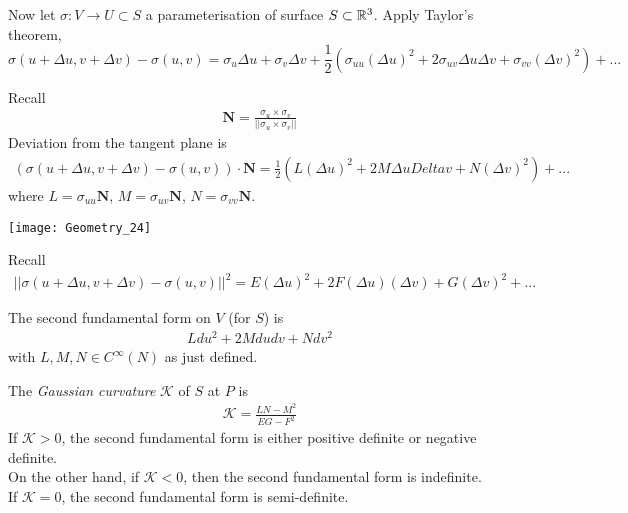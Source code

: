 \documentclass[a4paper]{article}
\begin{document}
Now let $\sigma: V \to U \subset S$ a parameterisation of surface $S \subset \mathbb{R}^3$. Apply Taylor's theorem, $$\sigma(u+\Delta u,v+\Delta v) - \sigma(u,v) = \sigma_u \Delta u + \sigma_v \Delta v + \frac{1}{2} (\sigma_{uu} (\Delta u)^2 + 2\sigma_{uv} \Delta u \Delta v + \sigma_{vv} (\Delta v)^2) + ...$$

Recall
\begin{equation*}
\begin{aligned}
\mathbf{N} = \frac{\sigma_u \times \sigma_v}{||\sigma_u \times \sigma_v||}
\end{aligned}
\end{equation*}
Deviation from the tangent plane is
\begin{equation*}
\begin{aligned}
(\sigma(u+\Delta u,v+\Delta v) - \sigma(u,v)) \cdot \mathbf{N} = \frac{1}{2} (L (\Delta u)^2 + 2M \Delta u Delta v + N (\Delta v)^2)+...
\end{aligned}
\end{equation*}
where $L=\sigma_{uu} \mathbf{N}$, $M=\sigma_{uv} \mathbf{N}$, $N=\sigma_{vv} \mathbf{N}$.

\texttt{[image: Geometry\_24]}

Recall
\begin{equation*}
\begin{aligned}
||\sigma(u+\Delta u,v+\Delta v) - \sigma(u,v)||^2 = E(\Delta u)^2 + 2F(\Delta u) (\Delta v) + G(\Delta v)^2 + ...
\end{aligned}
\end{equation*}

\begin{defi}
The second fundamental form on $V$ (for $S$) is
\begin{equation*}
\begin{aligned}
L du^2 + 2M dudv + N dv^2
\end{aligned}
\end{equation*}
with $L,M,N \in C^\infty(N)$ as just defined.
\end{defi}

\begin{defi}
The \emph{Gaussian curvature} $\mathcal{K}$ of $S$ at $P$ is 
\begin{equation*}
\begin{aligned}
\mathcal{K} = \frac{LN-M^2}{EG-F^2}
\end{aligned}
\end{equation*}
If $\mathcal{K}>0$, the second fundamental form is either positive definite or negative definite.\\
On the other hand, if $\mathcal{K}<0$, then the second fundamental form is indefinite.\\
If $\mathcal{K}=0$, the second fundamental form is semi-definite.
\end{defi}
\end{document}
